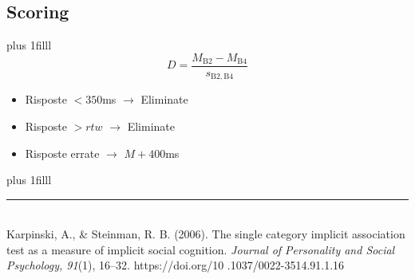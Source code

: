 \documentclass[compress]{beamer}
\begin{document}
\subsection*{Scoring}
\begin{frame}
	\vskip0pt plus 1filll
	\begin{equation*}
		D = \frac{M_{\mathrm{B2}} - M_{\mathrm{B4}}}{s_{\mathrm{B2, B4}}}
	\end{equation*}

\vspace{5mm}

\begin{itemize}
	\item Risposte $< 350$ms $ \rightarrow $ Eliminate
	\vspace{5mm}
	\item Risposte $> rtw$ $ \rightarrow $ Eliminate
	\vspace{5mm}
	\item Risposte errate $\rightarrow$ $M + 400$ms 
\end{itemize}
\vskip0pt plus 1filll

\color{template}\rule{0.30\linewidth}{0.5pt}\\
\color{black}
\scriptsize{Karpinski, A., \& Steinman, R. B. (2006). The single
	category implicit association test as a measure of
	implicit social cognition.\emph{ Journal of Personality and
	Social Psychology, 91}(1), 16–32. https://doi.org/10
	.1037/0022-3514.91.1.16}

\end{frame}
\end{document}
